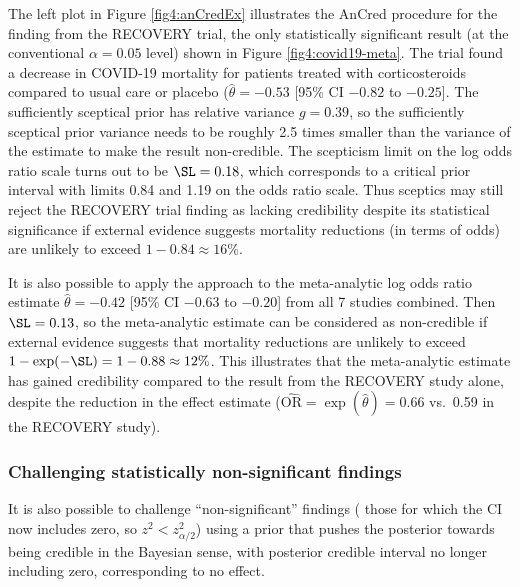 The left plot in Figure \ref{fig4:anCredEx} illustrates the AnCred procedure for
the finding from the RECOVERY trial, the only statistically significant result
(at the conventional $\alpha=0.05$ level) shown in Figure
\ref{fig4:covid19-meta}. The trial found a decrease in COVID-19 mortality for
patients treated with corticosteroids compared to usual care or placebo
($\hat{\theta} = -0.53$ [95\% CI $-0.82$ to $-0.25$]. The sufficiently sceptical
prior has relative variance $g = 0.39$, so the sufficiently sceptical prior
variance needs to be roughly 2.5 times smaller than the variance of the estimate
to make the result non-credible. The scepticism limit on the log odds ratio
scale turns out to be $\SL=0.18$, which corresponds to a critical prior interval
with limits 0.84 and 1.19 on the odds ratio scale. Thus sceptics may still
reject the RECOVERY trial finding as lacking credibility despite its statistical
significance if external evidence suggests mortality reductions (in terms of
odds) are unlikely to exceed $1 - 0.84 \approx 16 \%$.


It is also possible to apply the approach to the meta-analytic log odds ratio
estimate $\hat \theta = -0.42$ [95\% CI $-0.63$ to $-0.20$] from all 7 studies
combined. Then $\SL= 0.13$, so the meta-analytic estimate can be considered as
non-credible if external evidence suggests that mortality reductions are
unlikely to exceed $1-\exp(-\SL)=1 - 0.88 \approx 12 \%$. This illustrates that
the meta-analytic estimate has gained credibility compared to the result from
the RECOVERY study alone, despite the reduction in the effect estimate
($\widehat{\text{OR}} = \exp(\hat \theta) = 0.66$ vs.~0.59 in the RECOVERY
study).

\subsubsection{Challenging statistically non-significant findings}
\label{sec4:nonSigAnCred}
It is also possible to challenge ``non-significant'' findings (\ie{} those for
which the CI now includes zero, so $z^2 < z_{\alpha/2}^2$) using a prior that
pushes the posterior towards being credible in the Bayesian sense, with
posterior credible interval no longer including zero, corresponding to no
effect.

